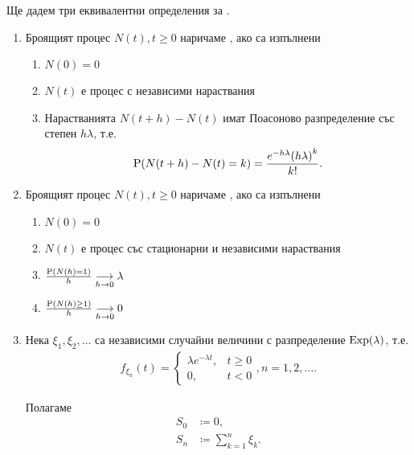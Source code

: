 \documentclass[numbers=endperiod, bibliography=totocnumbered]{scrartcl}
\begin{document}
\begin{definition}
  Ще дадем три еквивалентни определения за .

  \begin{enumerate}
    \item\label{def:pp-1} Броящият процес \( N(t), t \geq 0 \) наричаме , ако са изпълнени
    \begin{enumerate}
      \item \( N(0) = 0 \)
      \item \( N(t) \) е процес с независими нараствания
      \item Нарастванията \( N(t+h)-N(t) \) имат Поасоново разпределение със степен \( h\lambda \), т.е.
      \begin{align*}
        \Prob(N(t+h)-N(t) = k)
        =
        \frac{e^{-h\lambda} {(h\lambda)}^k} {k!}.
      \end{align*}
    \end{enumerate}

    \item\label{def:pp-2} Броящият процес \( N(t), t \geq 0 \) наричаме , ако са изпълнени
    \begin{enumerate}
      \item \( N(0) = 0 \)
      \item \( N(t) \) е процес със стационарни и независими нараствания
      \item \( \frac {\Prob(N(h) = 1)} h \Conv[h \to 0]{} \lambda \)
      \item \( \frac {\Prob(N(h) \geq 1)} h \Conv[h \to 0]{} 0 \)
    \end{enumerate}

    \item\label{def:pp-3} Нека \( \xi_1, \xi_2, \ldots \) са независими случайни величини с разпределение \( \DExp(\lambda) \), т.е.
    \begin{align*}
      f_{\xi_n}(t) =
      \begin{cases}
        \lambda e^{-\lambda t}, &t \geq 0 \\
        0, &t < 0
      \end{cases},
      n = 1, 2, \ldots.
    \end{align*}

    Полагаме
    \begin{align*}
      S_0 &\coloneqq 0, \\
      S_n &\coloneqq \sum_{k=1}^n \xi_k.
    \end{align*}


\end{enumerate}
\end{definition}
\end{document}
